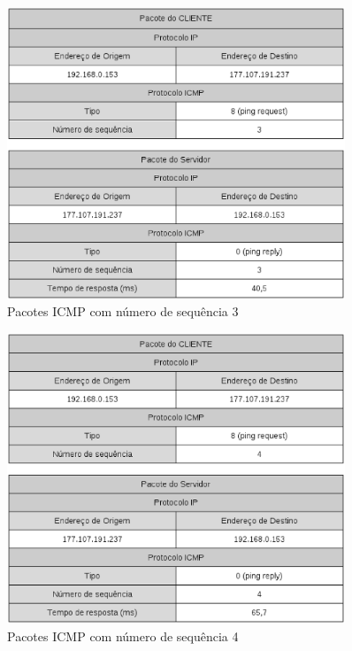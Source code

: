     \begin{figure}[h]
      \centering
      \includegraphics[width=0.9\textwidth]{figuras/pkg_icmp_seq_3.eps}
      \caption{Pacotes ICMP com número de sequência 3}
      \label{fig:pkg_icmp_seq_3}
    \end{figure}

    \begin{figure}[h]
      \centering
      \includegraphics[width=0.9\textwidth]{figuras/pkg_icmp_seq_4.eps}
      \caption{Pacotes ICMP com número de sequência 4}
      \label{fig:pkg_icmp_seq_4}
    \end{figure}
